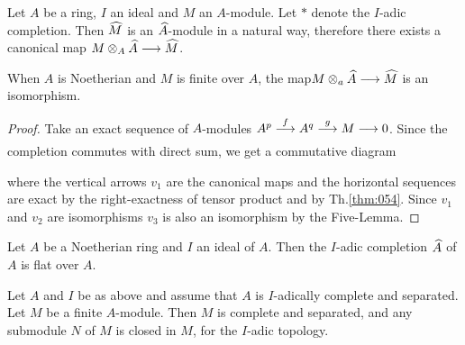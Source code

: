 \documentclass[../main]{subfiles}
\begin{document}
\newparagraph Let $A$ be a ring, $I$ an ideal and $M$ an $A$-module. Let $\ast$ denote the $I$-adic completion. Then $\widehat{M}$ is an $\widehat{A}$-module in a natural way, therefore there exists a canonical map $M \otimes_A \widehat{A} \longrightarrow \widehat{M}$. 

\begin{theorem}
\label{thm:055}
When $A$ is Noetherian and $M$ is finite over $A$, the map\newline $M \otimes_a \widehat{A} \longrightarrow \widehat{M}$ is an isomorphism.
\end{theorem}

\begin{proof}
Take an exact sequence of $A$-modules $A^p \varrightarrow{f} A^q \varrightarrow{g} M \varrightarrow{} 0$. Since the completion commutes with direct sum, we get a commutative diagram 

\begin{center}
\end{center}

where the vertical arrows $v_1$ are the canonical maps and the horizontal sequences are exact by the right-exactness of tensor product and by Th.\ref{thm:054}. Since $v_1$ and $v_2$ are isomorphisms $v_3$ is also an isomorphism by the Five-Lemma.
\end{proof}

\begin{corollary}
\label{cor:23.1}
Let $A$ be a Noetherian ring and $I$ an ideal of $A$. Then the $I$-adic completion $\widehat{A}$ of $A$ is flat over $A$.
\end{corollary}

\begin{corollary}
Let $A$ and $I$ be as above and assume that $A$ is $I$-adically complete and separated. Let $M$ be a finite $A$-module. Then $M$ is complete and separated, and any submodule $N$ of $M$ is closed in $M$, for the $I$-adic topology.
\end{corollary}
\end{document}
